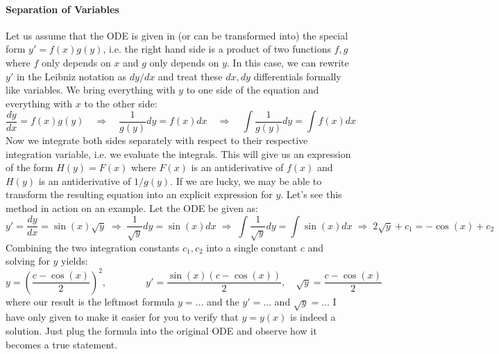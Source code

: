 
\paragraph{Separation of Variables}
Let us assume that the ODE is given in (or can be transformed into) the special form $y' = f(x) g(y)$, i.e. the right hand side is a product of two functions $f,g$ where $f$ only depends on $x$ and $g$ only depends on $y$. In this case, we can rewrite $y'$ in the Leibniz notation as $dy / dx$ and treat these $dx, dy$ differentials formally like variables. We bring everything with $y$ to one side of the equation and everything with $x$ to the other side:
\begin{equation}
\frac{dy}{dx} = f(x) g(y) 
\quad \Rightarrow \quad
\frac{1}{g(y)} dy = f(x) dx
\quad \Rightarrow \quad
\int \frac{1}{g(y)} dy = \int f(x) dx
\end{equation}
Now we integrate both sides separately with respect to their respective integration variable, i.e. we evaluate the integrals. This will give us an expression of the form $H(y) = F(x)$ where $F(x)$ is an antiderivative of $f(x)$ and $H(y)$ is an antiderivative of $1/g(y)$. If we are lucky, we may be able to transform the resulting equation into an explicit expression for $y$. Let's see this method in action on an example. Let the ODE be given as:
\begin{equation}
y' = \frac{dy}{dx} = \sin(x) \sqrt{y} 
\; \Rightarrow \; 
\frac{1}{\sqrt{y}} dy = \sin(x) dx
\; \Rightarrow \;
\int \frac{1}{\sqrt{y}} dy = \int \sin(x) dx
\; \Rightarrow \;
2 \sqrt{y} + c_1 = - \cos(x) + c_2
\end{equation}
Combining the two integration constants $c_1, c_2$ into a single constant $c$ and solving for $y$ yields:
\begin{equation}
y = \left( \frac{c - \cos(x)}{2} \right)^2,
\qquad \qquad
y' = \frac{\sin(x) (c-\cos(x))}{2},
\quad
\sqrt{y} = \frac{c - \cos(x)}{2}
\end{equation}
where our result is the leftmost formula $y = \ldots$ and the $y' = \ldots$ and $\sqrt{y} = \ldots$ I have only given to make it easier for you to verify that $y = y(x)$ is indeed a solution. Just plug the formula into the original ODE and observe how it becomes a true statement.

\medskip
[Q: Can it happen that the so found equation for $y$ cannot be solved explicitly for $y$, i.e. can we arrive at an implicit equation for $y$? I think so. ToDo: Try to find an example, where this happens. Maybe something where we get an expression $H(y) = y + \sin(y)$. I think, the function $y(x)$ that we are interested in will be the inverse of $H$. I think, the solution is $y(x) = H^{-1}(F(x))$]

